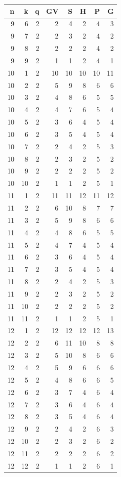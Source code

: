 \begin{tabular}[t]{|r|r|r|r|r|r|r|r|}
\hline
n & k & q & GV & S & H & P & G\\
\hline
\hline
9 & 6 & 2 & 2 & 4 & 2 & 4 & 3\\
\hline
9 & 7 & 2 & 2 & 3 & 2 & 4 & 2\\
\hline
9 & 8 & 2 & 2 & 2 & 2 & 4 & 2\\
\hline
9 & 9 & 2 & 1 & 1 & 2 & 4 & 1\\
\hline
10 & 1 & 2 & 10 & 10 & 10 & 10 & 11\\
\hline
10 & 2 & 2 & 5 & 9 & 8 & 6 & 6\\
\hline
10 & 3 & 2 & 4 & 8 & 6 & 5 & 5\\
\hline
10 & 4 & 2 & 4 & 7 & 6 & 5 & 4\\
\hline
10 & 5 & 2 & 3 & 6 & 4 & 5 & 4\\
\hline
10 & 6 & 2 & 3 & 5 & 4 & 5 & 4\\
\hline
10 & 7 & 2 & 2 & 4 & 2 & 5 & 3\\
\hline
10 & 8 & 2 & 2 & 3 & 2 & 5 & 2\\
\hline
10 & 9 & 2 & 2 & 2 & 2 & 5 & 2\\
\hline
10 & 10 & 2 & 1 & 1 & 2 & 5 & 1\\
\hline
11 & 1 & 2 & 11 & 11 & 12 & 11 & 12\\
\hline
11 & 2 & 2 & 6 & 10 & 8 & 7 & 7\\
\hline
11 & 3 & 2 & 5 & 9 & 8 & 6 & 6\\
\hline
11 & 4 & 2 & 4 & 8 & 6 & 5 & 5\\
\hline
11 & 5 & 2 & 4 & 7 & 4 & 5 & 4\\
\hline
11 & 6 & 2 & 3 & 6 & 4 & 5 & 4\\
\hline
11 & 7 & 2 & 3 & 5 & 4 & 5 & 4\\
\hline
11 & 8 & 2 & 2 & 4 & 2 & 5 & 3\\
\hline
11 & 9 & 2 & 2 & 3 & 2 & 5 & 2\\
\hline
11 & 10 & 2 & 2 & 2 & 2 & 5 & 2\\
\hline
11 & 11 & 2 & 1 & 1 & 2 & 5 & 1\\
\hline
12 & 1 & 2 & 12 & 12 & 12 & 12 & 13\\
\hline
12 & 2 & 2 & 6 & 11 & 10 & 8 & 8\\
\hline
12 & 3 & 2 & 5 & 10 & 8 & 6 & 6\\
\hline
12 & 4 & 2 & 5 & 9 & 6 & 6 & 6\\
\hline
12 & 5 & 2 & 4 & 8 & 6 & 6 & 5\\
\hline
12 & 6 & 2 & 3 & 7 & 4 & 6 & 4\\
\hline
12 & 7 & 2 & 3 & 6 & 4 & 6 & 4\\
\hline
12 & 8 & 2 & 3 & 5 & 4 & 6 & 4\\
\hline
12 & 9 & 2 & 2 & 4 & 2 & 6 & 3\\
\hline
12 & 10 & 2 & 2 & 3 & 2 & 6 & 2\\
\hline
12 & 11 & 2 & 2 & 2 & 2 & 6 & 2\\
\hline
12 & 12 & 2 & 1 & 1 & 2 & 6 & 1\\
\hline
\end{tabular}
